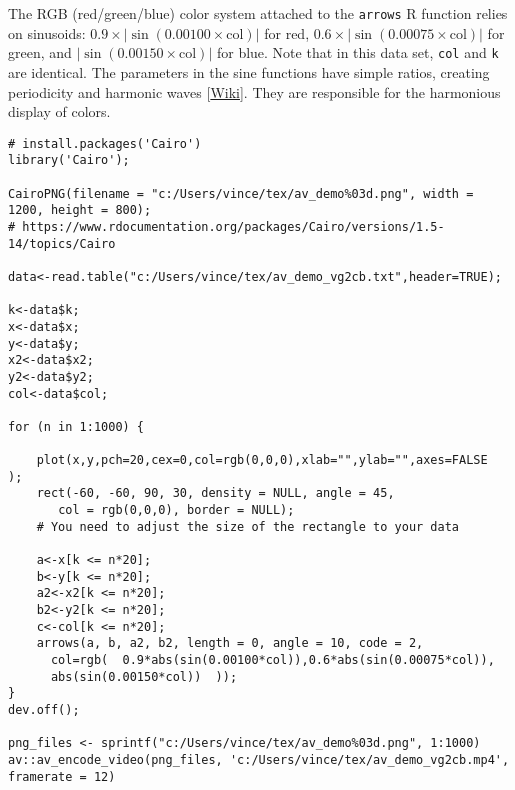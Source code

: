 \documentclass[10pt]{article}
\begin{document}
The RGB (red/green/blue) color system attached to the \texttt{arrows} R function relies on sinusoids: $0.9\times |\sin(0.00100 \times \mbox{col})|$ for red,
 $0.6\times |\sin(0.00075 \times\mbox{col})|$ for green, and  $|\sin(0.00150 \times\mbox{col})|$ for blue. Note that in this data set, \texttt{col} and \texttt{k} are
identical. The parameters in the sine functions have simple ratios, creating periodicity and harmonic waves [\href{https://en.wikipedia.org/wiki/Harmonic}{Wiki}]. They are responsible for the harmonious display of colors.
\quad
\begin{lstlisting}
# install.packages('Cairo')
library('Cairo');

CairoPNG(filename = "c:/Users/vince/tex/av_demo%03d.png", width = 1200, height = 800);
# https://www.rdocumentation.org/packages/Cairo/versions/1.5-14/topics/Cairo

data<-read.table("c:/Users/vince/tex/av_demo_vg2cb.txt",header=TRUE);

k<-data$k;
x<-data$x;
y<-data$y;
x2<-data$x2;
y2<-data$y2;
col<-data$col;

for (n in 1:1000) {

    plot(x,y,pch=20,cex=0,col=rgb(0,0,0),xlab="",ylab="",axes=FALSE  );
    rect(-60, -60, 90, 30, density = NULL, angle = 45,
       col = rgb(0,0,0), border = NULL);
    # You need to adjust the size of the rectangle to your data

    a<-x[k <= n*20];
    b<-y[k <= n*20];
    a2<-x2[k <= n*20];
    b2<-y2[k <= n*20];
    c<-col[k <= n*20];
    arrows(a, b, a2, b2, length = 0, angle = 10, code = 2,
      col=rgb(  0.9*abs(sin(0.00100*col)),0.6*abs(sin(0.00075*col)),
      abs(sin(0.00150*col))  ));
}
dev.off();

png_files <- sprintf("c:/Users/vince/tex/av_demo%03d.png", 1:1000)
av::av_encode_video(png_files, 'c:/Users/vince/tex/av_demo_vg2cb.mp4', framerate = 12)
\end{lstlisting}

\end{document}
